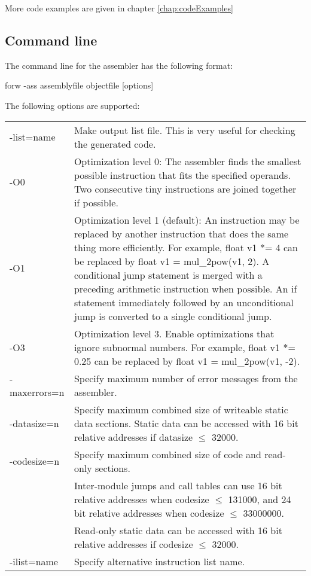 \documentclass[forwardcom.tex]{subfiles}
\begin{document}
More code examples are given in chapter \ref{chap:codeExamples}
\vspace{2mm}

\subsection{Command line} \label{assemblerCommandLine}
The command line for the assembler has the following format:

\vspace{2mm}
\hspace{5mm} {\ttfamily forw -ass assemblyfile objectfile [options]}

\vspace{2mm}
The following options are supported:\\
\begin{tabular}{|p{25mm}p{135mm}|}
\hline
-list=name & Make output list file. This is very useful for checking the generated code.\\
-O0 & Optimization level 0: The assembler finds the smallest possible instruction that fits the specified operands. Two consecutive tiny instructions are joined together if possible. \\
-O1 & Optimization level 1 (default): An instruction may be replaced by another instruction that does the same thing more efficiently. For example, {\ttfamily float v1 *= 4} can be replaced by
 {\ttfamily float v1 = mul\_2pow(v1, 2)}. 
 A conditional jump statement is merged with a preceding arithmetic instruction when possible.
 An {\ttfamily if} statement immediately followed by an
 unconditional jump is converted to a single conditional jump.\\
-O3 & Optimization level 3. Enable optimizations that ignore subnormal numbers. For example, {\ttfamily float v1 *= 0.25} can be replaced by {\ttfamily float v1 = mul\_2pow(v1, -2)}.\\
-maxerrors=n & Specify maximum number of error messages from the assembler.\\
-datasize=n & Specify maximum combined size of writeable static data sections. Static data can be accessed with 16 bit relative addresses if datasize $\leq$ 32000. \\
-codesize=n & Specify maximum combined size of code and read-only sections. \\
           & Inter-module jumps and call tables can use 16 bit relative addresses when codesize $\leq$ 131000, and 24 bit relative addresses when codesize $\leq$ 33000000. \\
           & Read-only static data can be accessed with 16 bit relative addresses if codesize $\leq$ 32000. \\
-ilist=name & Specify alternative instruction list name.\\
\hline
\end{tabular}
\vspace{2mm}
\end{document}
